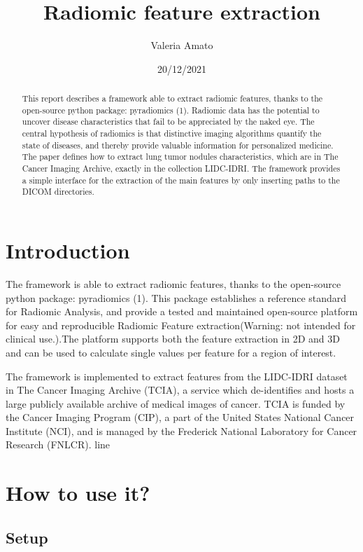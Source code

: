 \documentclass[12pt]{article}
\begin{document}
	\title {Radiomic feature extraction}
	\author {Valeria Amato}
	\date{20/12/2021}

	\maketitle

	\begin{abstract}
This report describes a framework able to extract radiomic features, thanks to the open-source python package: pyradiomics (1).
Radiomic data has the potential to uncover disease characteristics that fail to be appreciated by the naked eye.
The central hypothesis of radiomics is that distinctive imaging algorithms quantify the state of diseases, and thereby provide valuable information for personalized medicine. 
The paper defines how to extract lung tumor nodules characteristics, which are in The Cancer Imaging Archive, exactly in the collection LIDC-IDRI.
The framework provides a simple interface for the extraction of the main features by only inserting paths to the DICOM directories.
	\end{abstract}

	\section{Introduction}\label{sec:intro}
The framework is able to extract radiomic features, thanks to the open-source python package: pyradiomics (1). 
This package establishes a reference standard for Radiomic Analysis, and provide a tested and maintained open-source platform for easy and reproducible Radiomic Feature extraction(Warning: not intended for clinical use.).The platform supports both the feature extraction in 2D and 3D and can be used to calculate single values per feature for a region of interest.

The framework is implemented to extract features from the LIDC-IDRI dataset in The Cancer Imaging Archive (TCIA), a service which de-identifies and hosts a large publicly available archive of medical images of cancer.  TCIA is funded by the Cancer Imaging Program (CIP), a part of the United States  National Cancer Institute (NCI), and is managed by the Frederick National Laboratory for Cancer Research (FNLCR).
line

	\pagebreak
	\section{How to use it?}\label{sec:use}
	\subsection{Setup}\label{sub:install}
\end{document}
